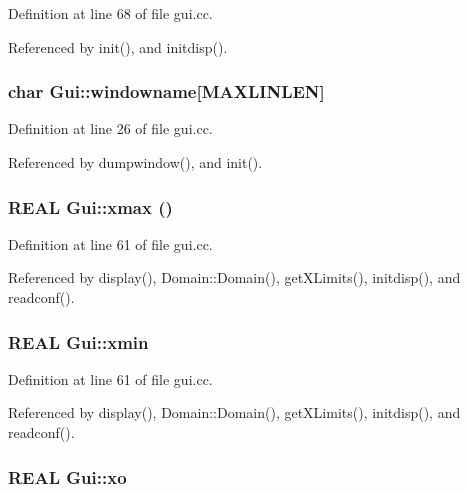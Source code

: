 Definition at line 68 of file gui.cc.

Referenced by init(), and initdisp().\hypertarget{namespaceGui_05e5a56061d9b709de0cbf9c54640465}{
\subsubsection[{windowname}]{\setlength{\rightskip}{0pt plus 5cm}char {\bf Gui::windowname}\mbox{[}MAXLINLEN\mbox{]}}}
\label{namespaceGui_05e5a56061d9b709de0cbf9c54640465}




Definition at line 26 of file gui.cc.

Referenced by dumpwindow(), and init().\hypertarget{namespaceGui_93f1d37d2bd27e638d68895f5d264cbc}{
\subsubsection[{xmax}]{\setlength{\rightskip}{0pt plus 5cm}REAL {\bf Gui::xmax} ()}}
\label{namespaceGui_93f1d37d2bd27e638d68895f5d264cbc}




Definition at line 61 of file gui.cc.

Referenced by display(), Domain::Domain(), getXLimits(), initdisp(), and readconf().\hypertarget{namespaceGui_0dfb5583ee08d6cf807efcd9813cf4c5}{
\subsubsection[{xmin}]{\setlength{\rightskip}{0pt plus 5cm}REAL {\bf Gui::xmin}}}
\label{namespaceGui_0dfb5583ee08d6cf807efcd9813cf4c5}




Definition at line 61 of file gui.cc.

Referenced by display(), Domain::Domain(), getXLimits(), initdisp(), and readconf().\hypertarget{namespaceGui_0ed0ea23e3f4484056c1581a73b38f95}{
\subsubsection[{xo}]{\setlength{\rightskip}{0pt plus 5cm}REAL {\bf Gui::xo}}}
\label{namespaceGui_0ed0ea23e3f4484056c1581a73b38f95}




